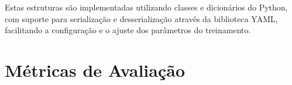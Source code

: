 Estas estruturas são implementadas utilizando classes e dicionários do Python, com suporte para serialização e desserialização através da biblioteca YAML, facilitando a configuração e o ajuste dos parâmetros do treinamento.





\section{Métricas de Avaliação}
\label{sec:metricas_avaliacao}

